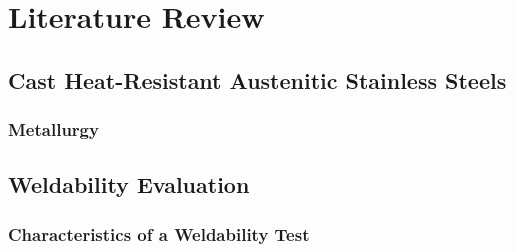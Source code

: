 \chapter{Literature Review} \label{ch:literature-review}

\section{Cast Heat-Resistant Austenitic Stainless Steels}

\subsection{Metallurgy}


\section{Weldability Evaluation} \label{sec:weldability-evaluation}

\subsection{Characteristics of a Weldability Test}

